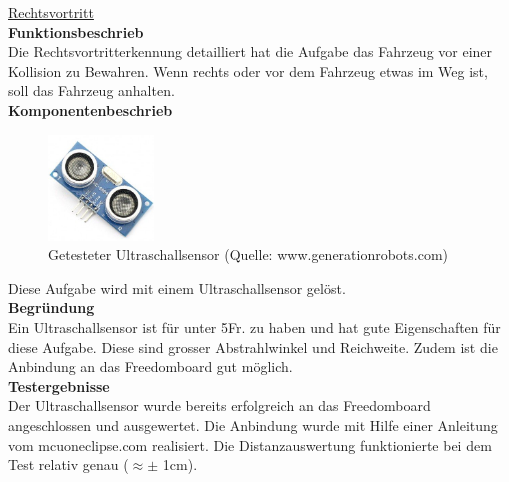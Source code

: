 \underline{Rechtsvortritt} \\[0.2cm]
\textbf{Funktionsbeschrieb}\\[0.2cm]
Die Rechtsvortritterkennung detailliert hat die Aufgabe das Fahrzeug vor einer Kollision zu Bewahren. Wenn rechts oder vor dem Fahrzeug etwas im Weg ist, soll das Fahrzeug anhalten.\\[0.2cm]
\textbf{Komponentenbeschrieb}\\[0.2cm]
\begin{figure} [h]
	\centering
	\includegraphics[width=0.25\textwidth]{03_Loesungskonzept/pictures/ultraschallsensor.png}
	\caption{Getesteter Ultraschallsensor (Quelle: www.generationrobots.com)}
\end{figure}
Diese Aufgabe wird mit einem Ultraschallsensor gelöst. \\[0.2cm]
\textbf{Begründung}\\[0.2cm]
Ein Ultraschallsensor ist für unter 5Fr. zu haben und hat gute Eigenschaften für diese Aufgabe. Diese sind grosser Abstrahlwinkel und Reichweite.
Zudem ist die Anbindung an das Freedomboard gut möglich.\\[0.2cm]
\textbf{Testergebnisse}\\[0.2cm]
Der Ultraschallsensor wurde bereits erfolgreich an das Freedomboard angeschlossen und  ausgewertet. Die Anbindung wurde mit Hilfe einer Anleitung vom mcuoneclipse.com realisiert. Die Distanzauswertung funktionierte bei dem Test relativ genau ($\approx \pm $ 1cm).
